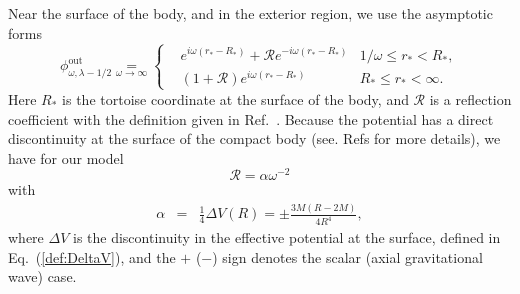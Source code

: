 \documentclass[aps,prd,longbibliography,reprint,twocolumn,amsmath,amssymb,amsfonts,showpacs,footnote,superscriptaddress]{revtex4-1}%
\newcommand{\phiout}{\phi^{\text{out}}_{\omega, \lambda-1/2}}
\begin{document}
Near the surface of the body, and in the exterior region, we use the asymptotic forms \cite{Zhang:2011pq}
\begin{equation}
\label{Approx_infinity}
\phiout  \scriptstyle{\underset{\omega \to \infty}{=}}
\left\{
\begin{aligned}
&e^{i\omega(r_*-R_*)}+\mathcal{R} e^{-i\omega (r_*-R_*)}& \scriptstyle{1/\omega\leq r_{*} < R_*,}\\
&\left(1+\mathcal{R}\right) e^{i\omega(r_*-R_*)}        & \scriptstyle{R_*\leq r_{*}<\infty.}
\end{aligned}
\right.
\end{equation}
Here $R_*$ is the tortoise coordinate at the surface of the body,
and $\mathcal{R}$ is a reflection coefficient with the definition given in Ref.~\cite{Berry_1982}.
Because the potential has a direct discontinuity at the surface of the compact body (see. Refs \cite{Zhang:2011pq,Berry_1982} for more details), we have for our model
%
\begin{equation}\label{R_reflection_1}
  \mathcal{R} = \alpha \omega^{-2}
\end{equation}
with
\begin{eqnarray} \label{eq:alpha}
  \alpha &=& \frac{1}{4} \Delta V(R) = \pm \frac{3M(R-2M)}{4 R^4} ,
\end{eqnarray}
where $\Delta V$ is the discontinuity in the effective potential at the surface, defined in Eq.~(\ref{def:DeltaV}), and the $+$ ($-$) sign denotes the scalar (axial gravitational wave) case.
\end{document}
